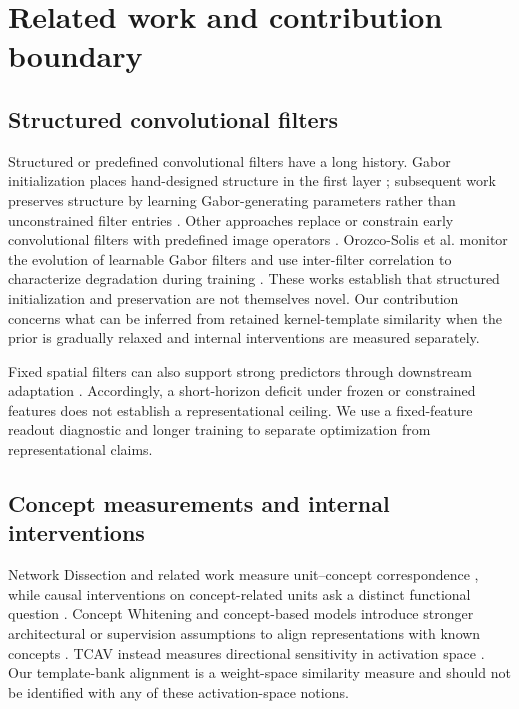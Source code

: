 \documentclass[10pt]{article}
\begin{document}
\section{Related work and contribution boundary}\label{sec:related}

\subsection{Structured convolutional filters}

Structured or predefined convolutional filters have a long history. Gabor initialization places hand-designed structure in the first layer \citep{ozbulak_2018_gabor-initialization}; subsequent work preserves structure by learning Gabor-generating parameters rather than unconstrained filter entries \citep{molaei_2020_gabor-filter-structure,wang_2024_learnable-gabor}. Other approaches replace or constrain early convolutional filters with predefined image operators \citep{ma_2020_predefined-filters,linse_2024_predefined-filters}. Orozco-Solis et al. monitor the evolution of learnable Gabor filters and use inter-filter correlation to characterize degradation during training \citep{orozco-solis_2024_learnable-gabor-filters}. These works establish that structured initialization and preservation are not themselves novel. Our contribution concerns what can be inferred from retained kernel-template similarity when the prior is gradually relaxed and internal interventions are measured separately.

Fixed spatial filters can also support strong predictors through downstream adaptation \citep{gaudio_2023_fixed-filters,gavrikov_2023_random-convolutions}. Accordingly, a short-horizon deficit under frozen or constrained features does not establish a representational ceiling. We use a fixed-feature readout diagnostic and longer training to separate optimization from representational claims.

\subsection{Concept measurements and internal interventions}

Network Dissection and related work measure unit--concept correspondence \citep{bau_2017_network-dissection}, while causal interventions on concept-related units ask a distinct functional question \citep{bau_2020_causal-units}. Concept Whitening and concept-based models introduce stronger architectural or supervision assumptions to align representations with known concepts \citep{chen_2020_concept-whitening,koh_2020_concept-bottlenecks,zarlenga_2022_concept-embeddings}. TCAV instead measures directional sensitivity in activation space \citep{kim_2018_tcav}. Our template-bank alignment is a weight-space similarity measure and should not be identified with any of these activation-space notions.
\end{document}
